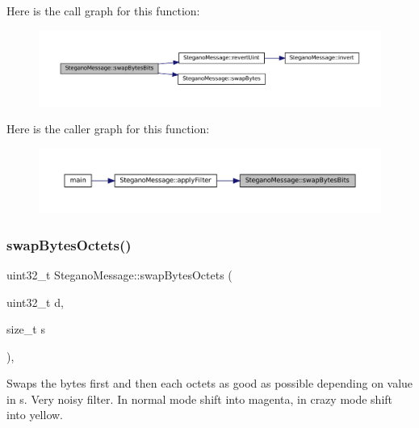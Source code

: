 Here is the call graph for this function\+:
\nopagebreak
\begin{figure}[H]
\begin{center}
\leavevmode
\includegraphics[width=350pt]{classSteganoMessage_a67f4f4c91ecddb89368c4b9cc42ac07e_cgraph}
\end{center}
\end{figure}
Here is the caller graph for this function\+:
\nopagebreak
\begin{figure}[H]
\begin{center}
\leavevmode
\includegraphics[width=350pt]{classSteganoMessage_a67f4f4c91ecddb89368c4b9cc42ac07e_icgraph}
\end{center}
\end{figure}
\mbox{\label{classSteganoMessage_ad21d0b7dd149e81d9a199fb26a799da4}} 
\subsubsection{\texorpdfstring{swapBytesOctets()}{swapBytesOctets()}}
{\footnotesize\ttfamily uint32\+\_\+t Stegano\+Message\+::swap\+Bytes\+Octets (\begin{DoxyParamCaption}\item[{uint32\+\_\+t}]{d,  }\item[{size\+\_\+t}]{s }\end{DoxyParamCaption})\hspace{0.3cm}{\ttfamily [static]}, {\ttfamily [private]}}



Swaps the bytes first and then each octets as good as possible depending on value in s. Very noisy filter. In normal mode shift into magenta, in crazy mode shift into yellow. 


